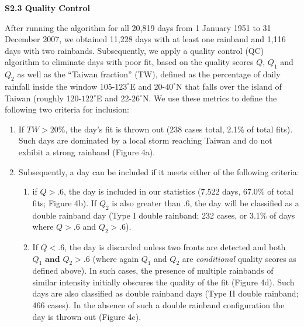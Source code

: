 \documentclass[draft,grl]{agutexSI}
\begin{document}
\begin{article}
\vspace{3mm}

\noindent\textbf{S2.3 Quality Control}

After running the algorithm for all 20,819 days from 1 January 1951 to 31 December 2007, we obtained 11,228 days with at least one rainband and 1,116 days with two rainbands. Subsequently, we apply a quality control (QC) algorithm to eliminate days with poor fit, based on the quality scores $Q$, $Q_1$ and $Q_2$ as well as the ``Taiwan fraction'' (TW), defined as the percentage of daily rainfall inside the window 105-$123^{\circ}$E and 20-$40^{\circ}$N that falls over the island of Taiwan (roughly 120-$122^{\circ}$E and 22-$26^{\circ}$N. We use these metrics to define the following two criteria for inclusion:

\begin{enumerate}

	\item If $TW > 20\%$, the day's fit is thrown out (238 cases total, 2.1\% of total fits). Such days are dominated by a local storm reaching Taiwan and do not exhibit a strong rainband (Figure 4a).  
	
	\item Subsequently, a day can be included if it meets either of the following criteria:
	
	\begin{enumerate} 
	
	\item if $Q>.6$, the day is included in our statistics (7,522 days, 67.0\% of total fits; Figure 4b). If $Q_2$ is also greater than .6, the day will be classified as a double rainband day (Type I double rainband; 232 cases, or 3.1\% of days where $Q>.6$ and $Q_2>.6$).
		
	\item If $Q<.6$, the day is discarded unless two fronts are detected and both $Q_1 \mathrm{\textbf{ and }} Q_2 > .6$ (where again $Q_1$ and $Q_2$ are \textit{conditional} quality scores as defined above). In such cases, the presence of multiple rainbands of similar intensity initially obscures the quality of the fit (Figure 4d). Such days are also classified as double rainband days (Type II double rainband; 466 cases). In the absence of such a double rainband configuration the day is thrown out (Figure 4c).
	
	\end{enumerate}
	
\end{enumerate}	


\end{article}
\end{document}
